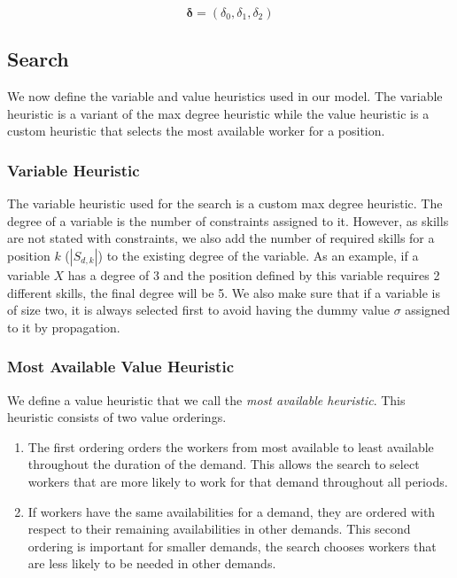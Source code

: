 \documentclass[../../thesis.tex]{subfiles}
\begin{document}
\begin{equation}
  \label{penalties:cp}
  \bm{\delta} = (\delta_0, \delta_1, \delta_2)
\end{equation}




\subsection{Search}

We now define the variable and value heuristics used in our model. The variable heuristic is a variant of the 
max degree heuristic while the value heuristic is a custom heuristic that selects the most available worker for a position.

\subsubsection{Variable Heuristic}

The variable heuristic used for the search is a custom max degree heuristic. 
The degree of a variable is the number of constraints assigned to it. However, as skills are not stated with constraints, 
we also add the number of required skills for a position $k$ ($| S_{d,k} |$) to the existing degree of the variable. 
As an example, if a variable $X$ has a degree of 3 and the position defined by this variable requires 2 different skills, the final degree will be 5.
We also make sure that if a variable is of size two, it is always selected first to avoid having the dummy value $\sigma$ assigned to it by 
propagation.


\subsubsection{Most Available Value Heuristic}

We define a value heuristic that we call the \emph{most available heuristic}. 
This heuristic consists of two value orderings.
\begin{enumerate}
  \item The first ordering orders the workers from most available to least available throughout the duration of the demand.
        This allows the search to select workers that are more likely to work for that demand throughout all periods.
  \item If workers have the same availabilities for a demand, they are ordered with respect to their remaining availabilities in other demands. This 
        second ordering is important for smaller demands, the search chooses workers that are less likely to be needed in other demands.
\end{enumerate}
\end{document}
